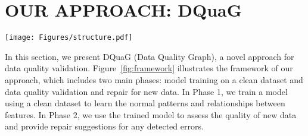 \section{OUR APPROACH: DQuaG}

\begin{figure*}[tb]
\centering
\texttt{[image: Figures/structure.pdf]}
\caption{Data Quality Validation Framework Using GNN. Top: Training on clean data. Bottom: Validating unseen data by reconstruction error comparison.}
\label{fig:framework}
\end{figure*}



In this section, we present DQuaG (Data Quality Graph), a novel approach for data quality validation. 
Figure~\ref{fig:framework} illustrates the framework of our approach, which includes two main phases: model training on a clean dataset and data quality validation and repair for new data. 
In Phase 1, we train a model using a clean dataset to learn the normal patterns and relationships between features. 
In Phase 2, we use the trained model to assess the quality of new data and provide repair suggestions for any detected errors. 


